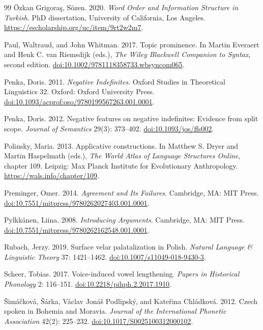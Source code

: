 \begin{thebibliography}{99}
Özkan Grigoraş, Sözen. 2020.
\textit{Word Order and Information Structure in Turkish}.
PhD dissertation, University of California, Los Angeles.
\url{https://escholarship.org/uc/item/9rt2w2m7}.

Paul, Waltraud, and John Whitman. 2017.
Topic prominence.
In Martin Everaert and Henk C. van Riemsdijk (eds.),
\textit{The Wiley Blackwell Companion to Syntax}, second edition.
\href{https://doi.org/10.1002/9781118358733.wbsyncom065}{doi:10.1002/9781118358733.wbsyncom065}.

Penka, Doris. 2011.
\textit{Negative Indefinites}.
Oxford Studies in Theoretical Linguistics 32.
Oxford: Oxford University Press.
\href{https://doi.org/10.1093/acprof:oso/9780199567263.001.0001}{doi:10.1093/acprof:oso/9780199567263.001.0001}.

Penka, Doris. 2012.
Negative features on negative indefinites: Evidence from split scope.
\textit{Journal of Semantics} 29(3): 373--402.
\href{https://doi.org/10.1093/jos/ffs002}{doi:10.1093/jos/ffs002}.

Polinsky, Maria. 2013.
Applicative constructions.
In Matthew S. Dryer and Martin Haspelmath (eds.),
\textit{The World Atlas of Language Structures Online}, chapter 109.
Leipzig: Max Planck Institute for Evolutionary Anthropology.
\url{https://wals.info/chapter/109}.

Preminger, Omer. 2014.
\textit{Agreement and Its Failures}.
Cambridge, MA: MIT Press.
\href{https://doi.org/10.7551/mitpress/9780262027403.001.0001}{doi:10.7551/mitpress/9780262027403.001.0001}.

Pylkkänen, Liina. 2008.
\textit{Introducing Arguments}.
Cambridge, MA: MIT Press.
\href{https://doi.org/10.7551/mitpress/9780262162548.001.0001}{doi:10.7551/mitpress/9780262162548.001.0001}.

Rubach, Jerzy. 2019.
Surface velar palatalization in Polish.
\textit{Natural Language \& Linguistic Theory} 37: 1421--1462.
\href{https://doi.org/10.1007/s11049-018-9430-3}{doi:10.1007/s11049-018-9430-3}.

Scheer, Tobias. 2017.
Voice-induced vowel lengthening.
\textit{Papers in Historical Phonology} 2: 116--151.
\href{https://doi.org/10.2218/pihph.2.2017.1910}{doi:10.2218/pihph.2.2017.1910}.

\v{S}im\'{a}\v{c}kov\'{a}, \v{S}\'{a}rka, V\'{a}clav Jon\'{a}\v{s} Podlipsk\'{y},
and Kate\v{r}ina Chl\'{a}dkov\'{a}. 2012.
Czech spoken in Bohemia and Moravia.
\textit{Journal of the International Phonetic Association} 42(2): 225--232.
\href{https://doi.org/10.1017/S0025100312000102}{doi:10.1017/S0025100312000102}.


\end{thebibliography}
